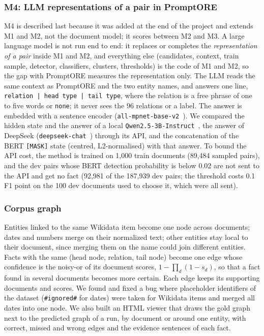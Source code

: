 \documentclass[pdflatex,sn-mathphys-num]{sn-jnl}
\begin{document}
\subsubsection{M4: LLM representations of a pair in PromptORE}\label{sec:llm}
M4 is described last because it was added at the end of the project and extends M1 and M2, not the document model; it scores between M2 and M3. A large language model is not run end to end: it replaces or completes the \emph{representation of a pair} inside M1 and M2, and everything else (candidates, context, train sample, detector, classifiers, clusters, thresholds) is the code of M1 and M2, so the gap with PromptORE measures the representation only. The LLM reads the same context as PromptORE and the two entity names, and answers one line, \texttt{relation | head type | tail type}, where the relation is a free phrase of one to five words or \texttt{none}; it never sees the 96 relations or a label. The answer is embedded with a sentence encoder (\texttt{all-mpnet-base-v2}~\cite{reimers2019sbert}). We compared the hidden state and the answer of a local \texttt{Qwen2.5-3B-Instruct}~\cite{qwen2024qwen25}, the answer of DeepSeek (\texttt{deepseek-chat}~\cite{deepseek2024v3}) through its API, and the concatenation of the BERT \texttt{[MASK]} state (centred, L2-normalised) with that answer. To bound the API cost, the method is trained on 1,000 train documents (89,484 sampled pairs), and the dev pairs whose BERT detection probability is below 0.02 are not sent to the API and get no fact (92,981 of the 187,939 dev pairs; the threshold costs 0.1 F1 point on the 100 dev documents used to choose it, which were all sent).

\subsubsection{Corpus graph}\label{sec:graph}

Entities linked to the same Wikidata item become one node across documents; dates and numbers merge on their normalized text; other entities stay local to their document, since merging them on the name could join different entities. Facts with the same (head node, relation, tail node) become one edge whose confidence is the noisy-or of its document scores, $1-\prod_d (1-s_d)$, so that a fact found in several documents becomes more certain. Each edge keeps its supporting documents and scores. We found and fixed a bug where placeholder identifiers of the dataset (\texttt{\#ignored\#} for dates) were taken for Wikidata items and merged all dates into one node. We also built an HTML viewer that draws the gold graph next to the predicted graph of a run, by document or around one entity, with correct, missed and wrong edges and the evidence sentences of each fact.
\end{document}
